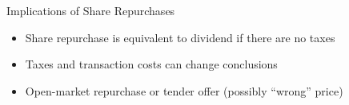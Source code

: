
\begin{highlightframe}{Implications of Share Repurchases}
	\begin{itemize}
		\item Share repurchase is equivalent to dividend if there are no taxes
		\item Taxes and transaction costs can change conclusions
		\item Open-market repurchase or tender offer (possibly ``wrong'' price)
	\end{itemize}
\end{highlightframe}

